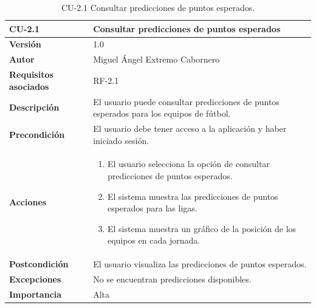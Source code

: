 \begin{table}[p]
    \centering
    \begin{tabularx}{\linewidth}{ p{} p{} }
        \toprule
        \textbf{CU-2.1}    & \textbf{Consultar predicciones de puntos esperados}\\
        \toprule
        \textbf{Versión}              & 1.0    \\
        \textbf{Autor}                & Miguel Ángel Extremo Cabornero \\
        \textbf{Requisitos asociados} & RF-2.1 \\
        \textbf{Descripción}          & El usuario puede consultar predicciones de puntos esperados para los equipos de fútbol. \\
        \textbf{Precondición}         & El usuario debe tener acceso a la aplicación y haber iniciado sesión. \\
        \textbf{Acciones}             &
        \begin{enumerate}
            \item El usuario selecciona la opción de consultar predicciones de puntos esperados.
            \item El sistema muestra las predicciones de puntos esperados para las ligas.
            \item El sistema muestra un gráfico de la posición de los equipos en cada jornada.
        \end{enumerate}\\
        \textbf{Postcondición}        & El usuario visualiza las predicciones de puntos esperados. \\
        \textbf{Excepciones}          & No se encuentran predicciones disponibles. \\
        \textbf{Importancia}          & Alta \\
        \bottomrule
    \end{tabularx}
    \caption{CU-2.1 Consultar predicciones de puntos esperados.}
\end{table}


